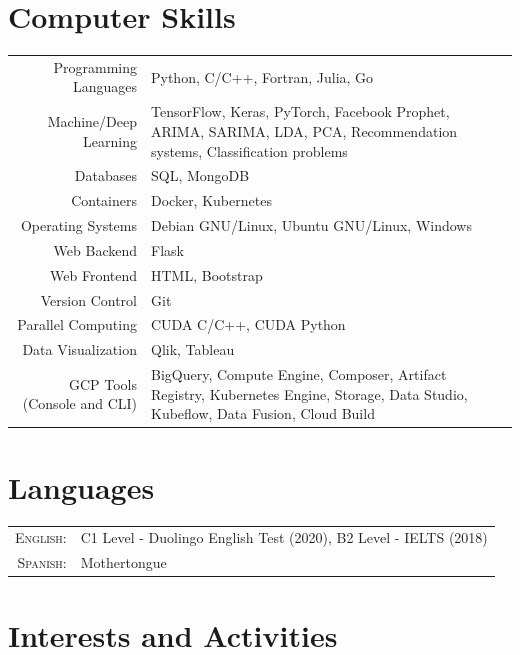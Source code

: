 \documentclass[a4paper,10pt]{article} %
\begin{document}
\section{Computer Skills}
\bigskip
\begin{tabular}{r|p{10.5cm}}
	Programming Languages & Python, C/C++, Fortran, Julia, Go \\
	Machine/Deep Learning & TensorFlow, Keras, PyTorch, Facebook Prophet, ARIMA, SARIMA, LDA, PCA, Recommendation systems, Classification problems\\
	Databases & SQL, MongoDB \\
	Containers & Docker, Kubernetes \\
	Operating Systems & Debian GNU/Linux, Ubuntu GNU/Linux, Windows \\
	Web Backend & Flask \\
	Web Frontend & HTML, Bootstrap \\
	Version Control & Git \\
	Parallel Computing & CUDA C/C++, CUDA Python\\
	Data Visualization & Qlik, Tableau \\
	GCP Tools (Console and CLI) & BigQuery, Compute Engine, Composer, Artifact Registry, Kubernetes Engine, Storage, Data Studio, Kubeflow, Data Fusion, Cloud Build
\end{tabular}


\section{Languages}
\bigskip
\begin{tabular}{rl}
	\textsc{English:} & C1 Level - Duolingo English Test (2020), B2 Level - IELTS (2018)\\
	
	\textsc{Spanish:} & Mothertongue
\end{tabular}


\section{Interests and Activities}
\bigskip
\end{document}
